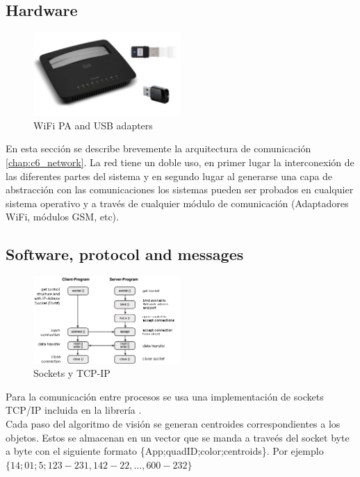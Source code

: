 \subsection{Hardware}
\begin{figure}
	\includegraphics[width=0.5\textwidth]{../Images/c2/hardware_comm.jpg}
	\caption{WiFi PA and USB adapters}
	\label{fig:hardwareComm}
\end{figure}

En esta secci\'on se describe brevemente la arquitectura de comunicaci\'on \ref{chap:c6_network}. La red tiene un doble uso, en primer lugar la interconexi\'on de las diferentes partes del sistema y en segundo lugar al generarse una capa de abstracci\'on con las comunicaciones los sistemas pueden ser probados en cualquier sistema operativo y a trav\'es de cualquier m\'odulo de comunicaci\'on (Adaptadores WiFi, m\'odulos GSM, etc).

\subsection{Software, protocol and messages}

\begin{figure}
	\begin{center}
		\includegraphics[width=0.5\textwidth, natwidth=448, natheight=263]{../Images/c2/socketstcpip.png}
	\end{center}
	\caption{Sockets y TCP-IP}
	\label{fig:socketstcpip}
\end{figure}

Para la comunicaci\'on entre procesos se usa una implementaci\'on de sockets TCP/IP \cite{TCPIP} incluida en la librer\'ia \cite{BOViL}.\\
Cada paso del algoritmo de visi\'on se generan centroides correspondientes a los objetos. Estos se almacenan en un vector que se manda a trave\'es del socket byte a byte con el siguiente formato \{App;quadID;color;centroids\}. Por ejemplo $\{14;01;5;123-231,142-22,...,600-232\}$

